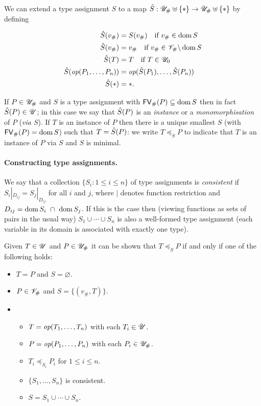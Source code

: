 \medskip
\noindent We can extend a type assignment $S$ to a map
$\Sext : \Unihash \disj \VarStar \rightarrow \Unihash \disj \VarStar$ by defining

\begin{align*}
    \Sext(v_\#) &= S(v_\#) \quad \text{if $v_\# \in \dom S$}\\
    \Sext(v_\#) &= v_\# \quad \text{if $v_\# \in \Var_\# \backslash \dom S$}\\
    \Sext(T) &= T \quad\text{if $T \in \Uni_0$}     \\
    \Sext(\op(P_1,\ldots,P_n)) &= \op(\Sext(P_1),\ldots,\Sext(P_n))\\
    \Sext(\star) &= \star.
\end{align*}%

\noindent If $P \in {\mathscr{U}_{\#}}$ and $S$ is a type assignment with $\mathsf{FV}_{\#}(P)
\subseteq \operatorname{dom} S$ then in fact $\hat{S}(P) \in \mathscr{U}$; in this case we say that
$\hat{S}(P)$ is an \textit{instance} or a \textit{monomorphisation} of $P$
(\textit{via $S$}).  If $T$ is an instance of $P$ then there is a unique
smallest $S$ (with $\mathsf{FV}_{\#}(P)=\operatorname{dom} S$) such that $T = \hat{S}(P)$: we write
$T\preceq_S P$ to indicate that $T$ is an instance of $P$ via $S$ and $S$ is
minimal.%

\paragraph{Constructing type assignments.}
We say that a collection $\{S_i: 1 \leq i \leq n\}$ of type assignments is
\textit{consistent} if $S_i|_{D_{ij}} = S_j|_{D_{ij}}$ for all $i$ and $j$,
where $|$ denotes function restriction and $D_{ij} = \operatorname{dom} S_i \ \cap \ \operatorname{dom}
S_j$.  If this is the case then (viewing functions as sets of pairs in the usual
way) $S_1 \cup \cdots \cup S_n$ is also a well-formed type assignment (each
variable in its domain is associated with exactly one type).

\medskip
\noindent Given $T \in \mathscr{U}$ and $P \in {\mathscr{U}_{\#}}$ it can be shown that $T \preceq_S P$ if
and only if one of the following holds:
\begin{itemize}
  \item $T = P$ and $S =\varnothing$.
  \item $P \in \mathscr{V}_\#$ and $S = \{(v_\#, T)\}$.
  \item
    \begin{itemize}
    \item $T = \textit{op}(T_1, \ldots, T_n)$ with each $T_i \in \mathscr{U}$.
    \item $P = \textit{op}(P_1, \ldots, P_n)$ with each $P_i \in {\mathscr{U}_{\#}}$.
    \item $T_i \preceq_{S_i} P_i$ for $1 \leq i \leq n$.
    \item $\{S_1, \ldots, S_n\}$ is consistent.
    \item $S = S_1 \cup \cdots \cup S_n$.
    \end{itemize}
\end{itemize}

